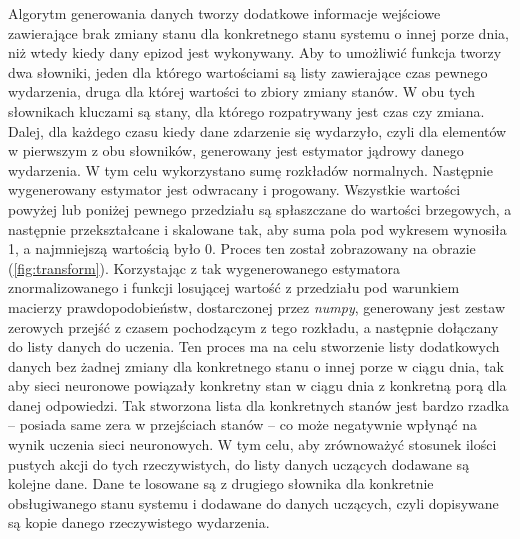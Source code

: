 Algorytm generowania danych tworzy dodatkowe informacje wejściowe zawierające brak zmiany stanu dla konkretnego stanu systemu o innej porze dnia, niż wtedy kiedy dany epizod jest wykonywany. Aby to umożliwić funkcja tworzy dwa słowniki, jeden dla którego wartościami są listy zawierające czas pewnego wydarzenia, druga dla której wartości to zbiory zmiany stanów. W obu tych słownikach kluczami są stany, dla którego rozpatrywany jest czas czy zmiana. Dalej, dla każdego czasu kiedy dane zdarzenie się wydarzyło, czyli dla elementów w pierwszym z obu słowników, generowany jest estymator jądrowy danego wydarzenia. W tym celu wykorzystano sumę rozkładów normalnych. Następnie wygenerowany estymator jest odwracany i progowany. Wszystkie wartości powyżej lub poniżej pewnego przedziału są spłaszczane do wartości brzegowych, a następnie przekształcane i skalowane tak, aby suma pola pod wykresem wynosiła 1, a najmniejszą wartością było 0. Proces ten został zobrazowany na obrazie (\ref{fig:transform}). Korzystając z tak wygenerowanego estymatora znormalizowanego i funkcji losującej wartość z przedziału pod warunkiem macierzy prawdopodobieństw, dostarczonej przez \textit{numpy}, generowany jest zestaw zerowych przejść z czasem pochodzącym z tego rozkładu, a następnie dołączany do listy danych do uczenia. Ten proces ma na celu stworzenie listy dodatkowych danych bez żadnej zmiany dla konkretnego stanu o innej porze w ciągu dnia, tak aby sieci neuronowe powiązały konkretny stan w ciągu dnia z konkretną porą dla danej odpowiedzi. Tak stworzona lista dla konkretnych stanów jest bardzo rzadka -- posiada same zera w przejściach stanów -- co może negatywnie wpłynąć na wynik uczenia sieci neuronowych. W tym celu, aby zrównoważyć stosunek ilości pustych akcji do tych rzeczywistych, do listy danych uczących dodawane są kolejne dane. Dane te losowane są z drugiego słownika dla konkretnie obsługiwanego stanu systemu i dodawane do danych uczących, czyli dopisywane są kopie danego rzeczywistego wydarzenia.


